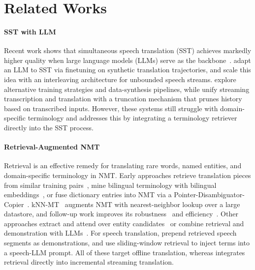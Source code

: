 \section{Related Works}

\paragraph{SST with LLM} Recent work shows that simultaneous speech translation (SST) achieves markedly higher quality when large language models (LLMs) serve as the backbone~\citep{ahmad-etal-2024-findings}. \citet{koshkin-etal-2024-transllama} adapt an LLM to SST via finetuning on synthetic translation trajectories, and \citet{ouyang-etal-2025-infinisst} scale this idea with an interleaving architecture for unbounded speech streams. \citet{fu2025efficientadaptivesimultaneousspeech} explore alternative training strategies and data-synthesis pipelines, while \citet{guo2025streamuniachievingstreamingspeech} unify streaming transcription and translation with a truncation mechanism that prunes history based on transcribed inputs. However, these systems still struggle with domain-specific terminology and \method addresses this by integrating a terminology retriever directly into the SST process.

\paragraph{Retrieval-Augmented NMT} Retrieval is an effective remedy for translating rare words, named entities, and domain-specific terminology in NMT. Early approaches retrieve translation pieces from similar training pairs~\citep{zhang-etal-2018-guiding}, mine bilingual terminology with bilingual embeddings~\citep{huck-etal-2019-better}, or fuse dictionary entries into NMT via a Pointer-Disambiguator-Copier~\citep{zhang-etal-2021-point}. kNN-MT~\citep{khandelwal2021nearest} augments NMT with nearest-neighbor lookup over a large datastore, and follow-up work improves its robustness~\citep{jiang-etal-2021-learning} and efficiency~\citep{meng-etal-2022-fast,zhu-etal-2023-ink}. Other approaches extract and attend over entity candidates~\citep{zeng-etal-2023-extract} or combine retrieval and demonstration with LLMs~\citep{li-etal-2025-leveraging}. For speech translation, \citet{li-etal-2024-optimizing-rare} prepend retrieved speech segments as demonstrations, and \citet{wu-etal-2025-locate} use sliding-window retrieval to inject terms into a speech-LLM prompt. All of these target offline translation, whereas \method integrates retrieval directly into incremental streaming translation.

